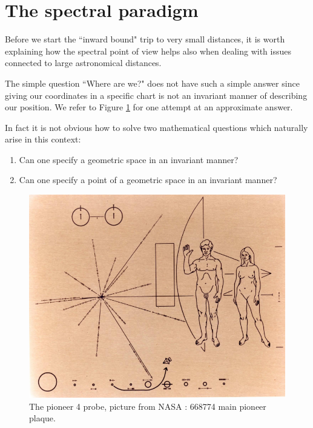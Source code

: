 \documentclass[12pt]{article}
\begin{document}
 
 




\section{The spectral paradigm}






Before we start the ``inward bound" trip \cite{Pais} to very small distances, it is worth explaining how the spectral point of view  helps  also when dealing with issues connected to large astronomical distances. 


The simple question ``Where are we?" does not have such a simple answer since giving our coordinates in a specific chart is not an invariant manner of describing our position. We refer to Figure \ref{pioneer} for one attempt at an approximate  answer.

In fact it is not obvious how to solve two mathematical questions which naturally arise in this context:
\begin{enumerate}
\item Can one specify a geometric space in an invariant manner?
\item Can one specify a point of a geometric space in an invariant manner?	
\end{enumerate}


\begin{figure}[H]
\begin{center}
\includegraphics[scale=0.8]{pioneer1.pdf}
\end{center}
\caption{The pioneer 4 probe, picture from NASA : 668774 main pioneer plaque. \label{pioneer} }
\end{figure}
\end{document}
